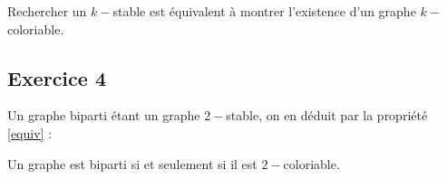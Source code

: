 \begin{prop}
	\label{equiv}
	Rechercher un $k-$stable est équivalent à montrer l'existence d'un graphe $k-$coloriable.
\end{prop}

\subsection{Exercice 4}

Un graphe biparti étant un graphe $2-$stable, on en déduit par la propriété \ref{equiv} :

\begin{prop}
	\label{biparti}
	Un graphe est biparti si et seulement si il est $2-$coloriable.
\end{prop}
